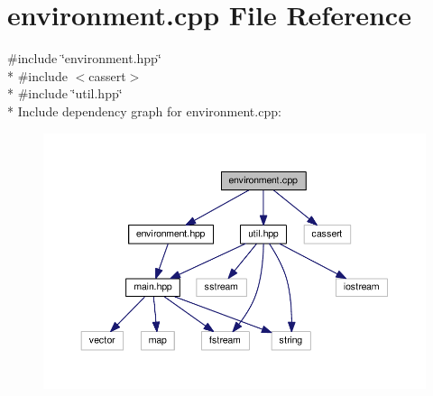 \section{environment.\+cpp File Reference}
\label{environment_8cpp}
{\ttfamily \#include \char`\"{}environment.\+hpp\char`\"{}}\\*
{\ttfamily \#include $<$cassert$>$}\\*
{\ttfamily \#include \char`\"{}util.\+hpp\char`\"{}}\\*
Include dependency graph for environment.\+cpp\+:
\nopagebreak
\begin{figure}[H]
\begin{center}
\leavevmode
\includegraphics[width=350pt]{environment_8cpp__incl}
\end{center}
\end{figure}
